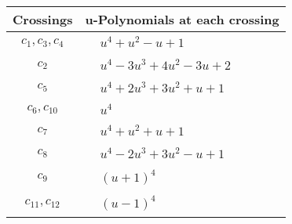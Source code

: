 \documentclass[1p]{elsarticle_modified}
\theoremstyle{definition}
\begin{document}
\begin{tabular}{m{50pt}|m{274pt}}
Crossings & \hspace{64pt}u-Polynomials at each crossing \\
\hline $$\begin{aligned}c_{1},c_{3},c_{4}\end{aligned}$$&$\begin{aligned}
&u^4+u^2- u+1
\end{aligned}$\\
\hline $$\begin{aligned}c_{2}\end{aligned}$$&$\begin{aligned}
&u^4-3 u^3+4 u^2-3 u+2
\end{aligned}$\\
\hline $$\begin{aligned}c_{5}\end{aligned}$$&$\begin{aligned}
&u^4+2 u^3+3 u^2+u+1
\end{aligned}$\\
\hline $$\begin{aligned}c_{6},c_{10}\end{aligned}$$&$\begin{aligned}
&u^4
\end{aligned}$\\
\hline $$\begin{aligned}c_{7}\end{aligned}$$&$\begin{aligned}
&u^4+u^2+u+1
\end{aligned}$\\
\hline $$\begin{aligned}c_{8}\end{aligned}$$&$\begin{aligned}
&u^4-2 u^3+3 u^2- u+1
\end{aligned}$\\
\hline $$\begin{aligned}c_{9}\end{aligned}$$&$\begin{aligned}
&(u+1)^4
\end{aligned}$\\
\hline $$\begin{aligned}c_{11},c_{12}\end{aligned}$$&$\begin{aligned}
&(u-1)^4
\end{aligned}$\\
\hline
\end{tabular}\\~\\
\end{document}
